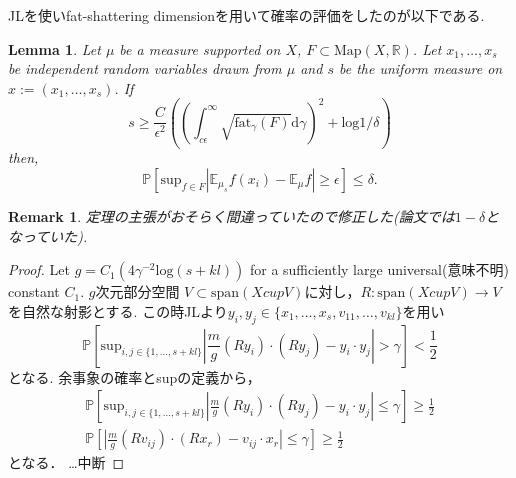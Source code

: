 \documentclass{jarticle}
\newtheorem{lem}[thm]{Lemma}
\newtheorem*{rem}{Remark}
\begin{document}
JLを使いfat-shattering dimensionを用いて確率の評価をしたのが以下である.
\begin{lem}
\label{minifat}
  Let $\mu$ be a measure supported on $X$, $F \subset \mathrm{Map}(X,\mathbb{R})$.
  Let $x_1,\dots, x_s$ be independent random variables drawn from $\mu$
  and $s$ be the uniform measure on $x := (x_1,\dots, x_s)$.
  If
\begin{equation*}
s \ge \frac{C}{\epsilon^2}(( \int_{c \epsilon}^{\infty}\sqrt{\mathrm{fat}_{\gamma}(F)}\mathrm{d}\gamma )^2 + \mathrm{log}1/\delta)
\end{equation*}
 then,
\begin{equation*}
 \mathbb{P}[ \mathrm{sup}_{f \in F} |\mathbb{E}_{\mu_s}f(x_i) -\mathbb{E}_{\mu}f|  \ge \epsilon] \le \delta.
\end{equation*}
\end{lem}
\begin{rem}
 定理の主張がおそらく間違っていたので修正した(論文では$1- \delta$となっていた).
\end{rem}
\begin{proof}
  Let $g= C_1(4\gamma^{-2} \mathrm{log}(s + kl))$
  for a sufficiently large universal(意味不明) constant $C_1$.
$g$次元部分空間 $V \subset \mathrm{span}(X cup V) $に対し，$ R : \mathrm{span}(X cup V) \to V$を自然な射影とする.
  この時JLより$y_i,y_j \in \{ x_1 ,\dots ,x_s,v_11 ,\dots ,v_{kl} \}$を用い
  \begin{equation*}
   \mathbb{P} [\mathrm{sup}_{i,j \in \{ 1,\dots, s+kl\} } | \frac{m}{g}(Ry_i)\cdot (Ry_j) - y_i \cdot  y_j| > \gamma ] < \frac{1}{2}
 \end{equation*}
となる.
余事象の確率とsupの定義から，
\begin{eqnarray*}
  \mathbb{P} [\mathrm{sup}_{i,j \in \{ 1,\dots, s+kl\} } | \frac{m}{g}(Ry_i)\cdot (Ry_j) - y_i \cdot  y_j |\le  \gamma ] \ge \frac{1}{2} \\
    \mathbb{P} [ | \frac{m}{g}(Rv_{ij})\cdot (Rx_r) - v_{ij} \cdot  x_r | \le  \gamma ] \ge \frac{1}{2}
\end{eqnarray*}
となる．
…中断
\end{proof}
\end{document}
